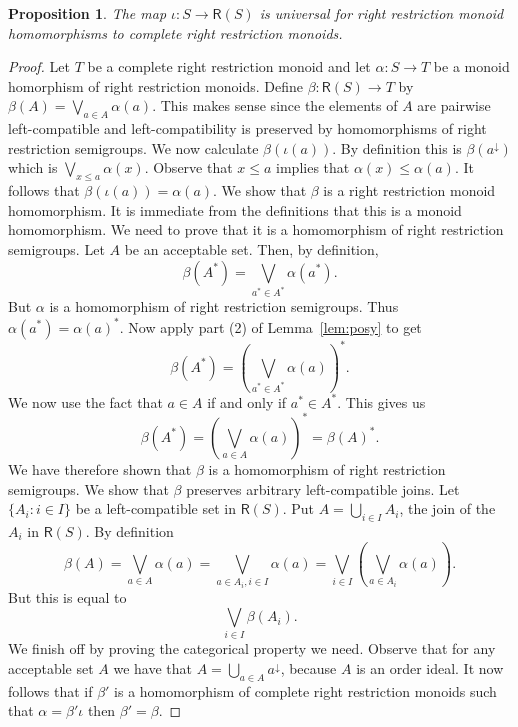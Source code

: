 \documentclass[a4paper]{amsart}
\newtheorem{proposition}[theorem]{Proposition}
\begin{document}
\begin{proposition}\label{prop:truss}
The map $\iota \colon S \rightarrow \mathsf{R}(S)$ is universal for right restriction monoid homomorphisms
to complete right restriction monoids.
\end{proposition}
\begin{proof} Let $T$ be a complete right restriction monoid and let $\alpha \colon S \rightarrow T$
be a monoid homorphism of right restriction monoids.
Define $\beta \colon \mathsf{R}(S) \rightarrow T$ by
$\beta (A) = \bigvee_{a \in A} \alpha (a)$.
This makes sense since the elements of $A$ are pairwise left-compatible
and left-compatibility is preserved by homomorphisms of right restriction semigroups.
We now calculate $\beta (\iota (a))$.
By definition this is  $\beta (a^{\downarrow})$ which is
$\bigvee_{x \leq a} \alpha (x)$.
Observe that $x \leq a$ implies that $\alpha (x) \leq \alpha(a)$.
It follows that  $\beta (\iota (a)) = \alpha (a)$.
We show that $\beta$ is a right restriction monoid homomorphism.
It is immediate from the definitions that this is a monoid homomorphism.
We need to prove that it is a homomorphism of right restriction semigroups.
Let $A$ be an acceptable set.
Then, by definition,
$$\beta (A^{\ast}) = \bigvee_{a^{\ast} \in A^{\ast}} \alpha (a^{\ast}).$$
But $\alpha$ is a homomorphism of right restriction semigroups.
Thus $\alpha (a^{\ast}) = \alpha (a)^{\ast}$.
Now apply part (2) of Lemma~\ref{lem:posy} to get
$$\beta (A^{\ast}) = \left( \bigvee_{a^{\ast} \in A^{\ast}} \alpha (a) \right)^{\ast}.$$
We now use the fact that $a \in A$ if and only if $a^{\ast} \in A^{\ast}$.
This gives us 
$$\beta (A^{\ast}) = \left( \bigvee_{a \in A} \alpha (a) \right)^{\ast} = \beta (A)^{\ast}.$$
We have therefore shown that $\beta$ is a homomorphism of right restriction semigroups.
We show that $\beta$ preserves arbitrary left-compatible joins.
Let $\{A_{i} \colon i \in I \}$ be a left-compatible set in $\mathsf{R}(S)$.
Put $A = \bigcup_{i \in I} A_{i}$, the join of the $A_{i}$ in  $\mathsf{R}(S)$.
By definition
$$\beta (A) = \bigvee_{a \in A} \alpha (a) = \bigvee_{a \in A_{i}, i \in I} \alpha (a) = \bigvee_{i \in I}\left( \bigvee_{a \in A_{i}} \alpha (a)\right).$$
But this is equal to
$$\bigvee_{i \in I} \beta (A_{i}).$$
We finish off by proving the categorical property we need. 
Observe that for any acceptable set $A$ we have that $A = \bigcup_{a \in A} a^{\downarrow}$, because $A$ is an order ideal.
It now follows that if $\beta'$ is a homomorphism of complete right restriction monoids 
such that $\alpha = \beta' \iota$ then $\beta' = \beta$.
\end{proof}
\end{document}
